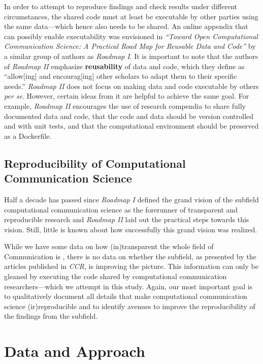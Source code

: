 In order to attempt to reproduce findings and check results under different circumstances, the shared code must at least be executable by other parties using the same data---which hence also needs to be shared.
An online appendix that can possibly enable executability was envisioned in \textit{``Toward Open Computational Communication Science: A Practical Road Map for Reusable Data and Code''} \parencite[\textit{Roadmap II} hereinafter]{van2019computational} by a similar group of authors as \textit{Roadmap I}. It is important to note that the authors of \textit{Roadmap II} emphasize \textbf{reusability} of data and code, which they define as ``allow[ing] and encourag[ing] other scholars to adapt them to their specific needs.''  \textit{Roadmap II} does not focus on making data and code executable by others \textit{per se}. However, certain ideas from it are helpful to achieve the same goal. For example, \textit{Roadmap II} encourages the use of research compendia to share fully documented data and code, that the code and data should be version controlled and with unit tests, and that the computational environment should be preserved as a Dockerfile.

\subsection{Reproducibility of Computational Communication Science}

Half a decade has passed since \textit{Roadmap I} defined the grand vision of the subfield computational communication science as the forerunner of transparent and reproducible research and \textit{Roadmap II} laid out the practical steps towards this vision. Still, little is known about how successfully this grand vision was realized.

While we have some data on how (in)transparent the whole field of Communication is \parencite[]{haim:2023:H,markowitz:2021:TAE,Knoepfle2024}, there is no data on whether the subfield, as presented by the articles published in \textit{CCR}, is improving the picture.
This information can only be gleaned by executing the code shared by computational communication researchers---which we attempt in this study.
Again, our most important goal is to qualitatively document all details that make computational communication science (ir)reproducible and to identify avenues to improve the reproducibility of the findings from the subfield.

\section{Data and Approach}

